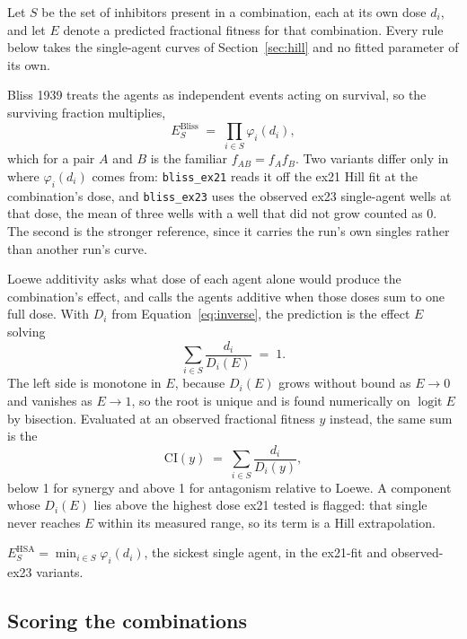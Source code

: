 Let $S$ be the set of inhibitors present in a combination, each at its own dose $d_i$,
and let $E$ denote a predicted fractional fitness for that combination. Every rule below
takes the single-agent curves of Section~\ref{sec:hill} and no fitted parameter of its
own.

 Bliss 1939 treats the agents as independent events acting
on survival, so the surviving fraction multiplies,
%
\begin{equation}
  E^{\text{Bliss}}_{S} \;=\; \prod_{i \in S} \varphi_i(d_i) ,
  \label{eq:bliss}
\end{equation}
%
which for a pair $A$ and $B$ is the familiar $f_{AB} = f_A f_B$. Two variants differ only
in where $\varphi_i(d_i)$ comes from: \texttt{bliss\_ex21} reads it off the ex21 Hill fit
at the combination's dose, and \texttt{bliss\_ex23} uses the observed ex23 single-agent
wells at that dose, the mean of three wells with a well that did not grow counted as 0.
The second is the stronger reference, since it carries the run's own singles rather than
another run's curve.

 Loewe additivity asks what dose of each agent alone would
produce the combination's effect, and calls the agents additive when those doses sum to
one full dose. With $D_i$ from Equation~\ref{eq:inverse}, the prediction is the effect
$E$ solving
%
\begin{equation}
  \sum_{i \in S} \frac{d_i}{D_i(E)} \;=\; 1 .
  \label{eq:loewe}
\end{equation}
%
The left side is monotone in $E$, because $D_i(E)$ grows without bound as $E \to 0$ and
vanishes as $E \to 1$, so the root is unique and is found numerically on
$\operatorname{logit} E$ by bisection. Evaluated at an observed fractional fitness $y$
instead, the same sum is the 
%
\begin{equation}
  \mathrm{CI}(y) \;=\; \sum_{i \in S} \frac{d_i}{D_i(y)} ,
  \label{eq:ci}
\end{equation}
%
below 1 for synergy and above 1 for antagonism relative to Loewe. A component whose
$D_i(E)$ lies above the highest dose ex21 tested is flagged: that single never reaches
$E$ within its measured range, so its term is a Hill extrapolation.

 $E^{\text{HSA}}_{S} = \min_{i \in S} \varphi_i(d_i)$, the
sickest single agent, in the ex21-fit and observed-ex23 variants.

\subsection{Scoring the combinations}
\label{sec:scoring}

